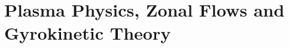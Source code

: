 
\chapter{Plasma Physics, Zonal Flows and Gyrokinetic Theory}
\label{chap:theory}

\thispagestyle{empty}
\newpage